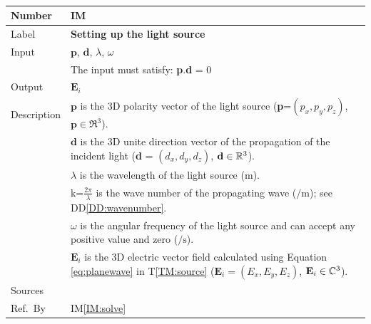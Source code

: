 \documentclass[12pt]{article}
\newcommand{\colBwidth}{0.82\textwidth} \newcommand{\colCwidth}{0.1\textwidth}
\newcounter{instnum} %
\begin{document}
	~\newline \noindent \begin{minipage}{\textwidth}
		\renewcommand*{\arraystretch}{1.5} \begin{tabular}{| p{\colAwidth} |
				p{\colBwidth}|} \hline \rowcolor[gray]{0.9} Number&
			IM{instnum}\theinstnum \label{IM:source}\\ \hline Label& \bf
			Setting up the light source\\ \hline Input&$\textbf{p}$, $\textbf{d}$,
			$\lambda$, $\omega$ \\ & The input must satisfy: \textbf{p}.\textbf{d} = 0 \\
			\hline Output&$\textbf{E}_i$ \\ \hline Description&$\textbf{p}$ is the 3D
			polarity vector of the light source (\textbf{p}=$(p_x,p_y,p_z)$, $\textbf{p}
			\in \Re^3$).\\ &$\textbf{d}$ is the 3D unite direction vector of the
			propagation of the incident light (\textbf{d} = $(d_x,d_y,d_z)$, $\textbf{d}\in
			\Bbb R^3$).\\ &$\lambda$ is the wavelength of the light source
			($\si{\meter}$).\\ &k=$\frac{2 \pi}{\lambda}$ is the wave number of the
			propagating wave ($\si{\per \meter}$); see DD\ref{DD:wavenumber}.\\ & $\omega$
			is the angular frequency of the light source and can accept any positive value
			and zero ($\si{\per \second}$).\\ &$\textbf{E}_i$ is the 3D electric vector
			field calculated using Equation \ref{eq:planewave} in T\ref{TM:source}
			($\textbf{E}_i=(E_x,E_y,E_z)$, $\textbf{E}_i\in \Bbb C^3$). \\ \hline Sources&
			\cite{monk2003finite} \\ \hline Ref.\ By & IM\ref{IM:solve}\\ \hline
	\end{tabular} \end{minipage}\\
	
	
	
	
	
	
	
\end{document}
